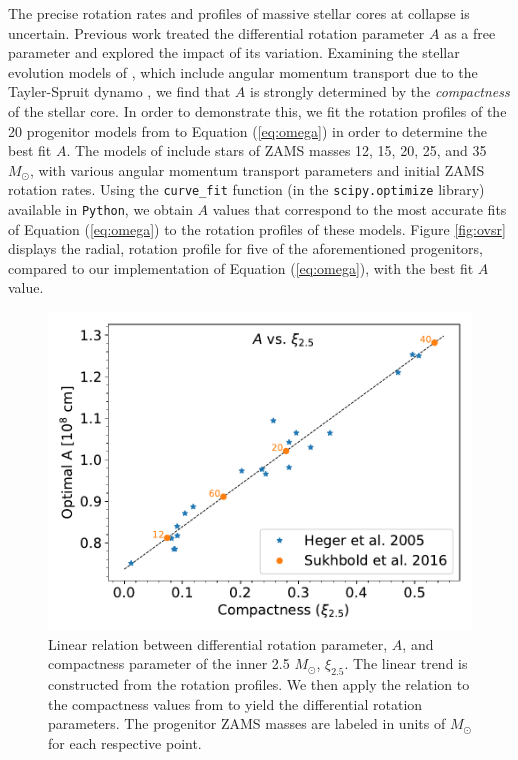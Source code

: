 \documentclass[twocolumn,times]{aastex62}  %
\begin{document}
The precise rotation rates and profiles of massive stellar cores at collapse is uncertain.
Previous work \citep[e.g.,][]{abdik:2014} treated the differential rotation parameter $A$ as a free parameter and explored the impact of its variation.
Examining the stellar evolution models of \citet{heger:2005}, which include angular momentum transport due to the Tayler-Spruit dynamo \citep{spruit:2002}, we find that $A$ is strongly determined by the {\it compactness} \citep{oconnor:2011} of the stellar core.
In order to demonstrate this, we fit the rotation profiles of the 20 progenitor models from \citet{heger:2005} to Equation (\ref{eq:omega}) in order to determine the best fit $A$.
The models of \citet{heger:2005} include stars of ZAMS masses 12, 15, 20, 25, and 35 $M_{\odot}$, with various angular momentum transport parameters and initial ZAMS rotation rates.  
Using the \texttt{curve\_fit} function (in the \texttt{scipy.optimize} library) available in \texttt{Python}, we obtain $A$ values that correspond to the most accurate fits of Equation (\ref{eq:omega}) to the rotation profiles of these models.  Figure \ref{fig:ovsr} displays the radial, rotation profile for five of the aforementioned progenitors, compared to our implementation of Equation (\ref{eq:omega}), with the best fit $A$ value.


\begin{figure}[t]
    \centering
    \includegraphics[scale=0.45]{figures/a_vs_compact.pdf}
    \caption{Linear relation between differential rotation parameter, $A$, and compactness parameter of the inner 2.5 $M_\odot$, $\xi_{2.5}$.  The linear trend is constructed from the \citet{heger:2005} rotation profiles.  We then apply the relation to the compactness values from \citet{Suk:2016} to yield the differential rotation parameters.  The progenitor ZAMS masses are labeled in units of $M_\odot$ for each respective point.}
    \label{fig:a_vs_comp}
\end{figure}
\end{document}
